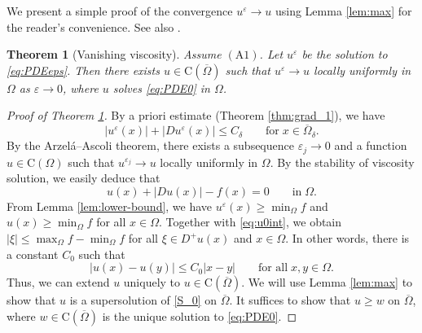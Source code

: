 \documentclass[11pt,reqno]{amsart}
\numberwithin{figure}{section}
\theoremstyle{plain}
\newtheorem{thm}{Theorem}[section]
\theoremstyle{remark}
\numberwithin{equation}{section}
\newcommand{\rmC}{\mathrm{C}}
\begin{document}
We present a simple proof of the convergence $u^\varepsilon \to u$ using Lemma \ref{lem:max} for the reader's convenience. See also \cite[Theorem VII.3]{Capuzzo-Dolcetta1990}.
\begin{thm}[Vanishing viscosity]\label{thm:qual} Assume $\mathrm{(A1)}$. Let $u^\varepsilon$ be the solution to \eqref{eq:PDEeps}. Then there exists $u \in \mathrm{C}(\overline{\Omega})$ such that $u^\varepsilon \rightarrow u$ locally uniformly in $\Omega$ as $\varepsilon\rightarrow 0$, where $u$ solves \eqref{eq:PDE0} in $\Omega$.
\end{thm}

\begin{proof}[Proof of Theorem \ref{thm:qual}] By a priori estimate (Theorem \ref{thm:grad_1}), we have
\begin{equation}\label{e:priorie_eps}
    |u^\varepsilon(x)| + |Du^\varepsilon(x)| \leq C_\delta \qquad\text{for}\;x\in \overline{\Omega}_\delta.
\end{equation}
By the Arzel\'a--Ascoli theorem, there exists a subsequence $\varepsilon_j\to 0$ and a function $u\in \rmC(\Omega)$ such that $u^{\varepsilon_j}\to u$ locally uniformly in $\Omega$. By the stability of viscosity solution, we easily deduce that 
\begin{equation}\label{eq:u0int}
     u(x) + |Du(x)| - f(x) = 0 \qquad\text{in}\;\Omega.
\end{equation}
From Lemma \ref{lem:lower-bound}, we have $  u^\varepsilon(x)\geq \min_{\Omega} f$ and  $  u(x)\geq \min_{\Omega} f$ for all $x\in \Omega$. Together with \eqref{eq:u0int}, we obtain $|\xi|\leq \max_\Omega f - \min_\Omega f$ for all $\xi\in D^+u(x)$ and $x\in \Omega$. In other words, there is a constant $C_0$ such that
\begin{equation}\label{e:C0}
    |u(x) - u(y)| \leq C_0|x-y| \qquad\text{for all}\;x,y\in \Omega.
\end{equation}
Thus, we can extend $u$ uniquely to $u\in \rmC(\overline{\Omega})$. We will use Lemma \ref{lem:max} to show that $u$ is a supersolution of \eqref{S_0} on $\overline{\Omega}$. It suffices to show that $u\geq w$ on $\overline{\Omega}$, where $w\in \rmC(\overline{\Omega})$ is the unique solution to \eqref{eq:PDE0}.


\end{proof}
\end{document}
